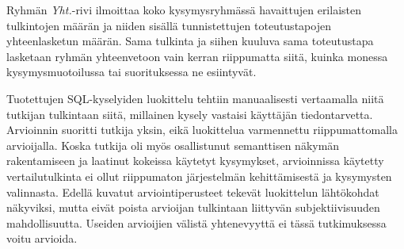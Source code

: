 Ryhmän \textit{Yht.}-rivi ilmoittaa koko kysymysryhmässä havaittujen
erilaisten tulkintojen määrän ja niiden sisällä tunnistettujen
toteutustapojen yhteenlasketun määrän. Sama tulkinta ja siihen kuuluva
sama toteutustapa lasketaan ryhmän yhteenvetoon vain kerran riippumatta
siitä, kuinka monessa kysymysmuotoilussa tai suorituksessa ne esiintyvät.

Tuotettujen SQL-kyselyiden luokittelu tehtiin manuaalisesti vertaamalla
niitä tutkijan tulkintaan siitä, millainen kysely vastaisi käyttäjän
tiedontarvetta. Arvioinnin suoritti tutkija yksin, eikä luokittelua
varmennettu riippumattomalla arvioijalla. Koska tutkija oli myös
osallistunut semanttisen näkymän rakentamiseen ja laatinut
kokeissa käytetyt kysymykset, arvioinnissa käytetty vertailutulkinta ei ollut
riippumaton järjestelmän kehittämisestä ja kysymysten valinnasta.
Edellä kuvatut arviointiperusteet tekevät luokittelun lähtökohdat
näkyviksi, mutta eivät poista arvioijan tulkintaan liittyvän
subjektiivisuuden mahdollisuutta. Useiden arvioijien välistä yhtenevyyttä ei
tässä tutkimuksessa voitu arvioida.
